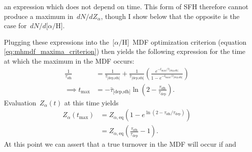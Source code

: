 \documentclass[12pt]{article}
\newcommand{\ah}{\ensuremath{\text{[$\alpha$/H]}}}
\newcommand{\timescale}[1]{\ensuremath{\tau_\text{#1}}}
\newcommand{\harmonic}[2]{\ensuremath{\bar{\tau}_\text{[#1,#2]}}}
\begin{document}
an expression which does not depend on time.
This form of SFH therefore cannot produce a maximum in~$dN / dZ_\alpha$, though
I show below that the opposite is the case for~$dN / d\ah$.
\par
Plugging these expressions into the~\ah~MDF optimization criterion (equation
\ref{eq:mhmdf_maxima_criterion}) then yields the following expression for the
time at which the maximum in the MDF occurs:
\begin{subequations}\begin{align}
\frac{1}{\timescale{sfh}} &= \frac{1}{\harmonic{dep}{sfh}} +
\frac{1}{\harmonic{dep}{sfh}} \left(\frac{
	e^{-t_\text{max} / \harmonic{dep}{sfh}}
}{
	1 - e^{-t_\text{max} / \harmonic{dep}{sfh}}
}\right)
\\
\implies t_\text{max} &= -\harmonic{dep}{sfh} \ln \left( 2 -
\frac{\timescale{sfh}}{\timescale{dep}}\right).
\end{align}\end{subequations}
Evaluation~$Z_\alpha(t)$ at this time yields
\begin{subequations}\begin{align}
Z_\alpha(t_\text{max}) &= Z_{\alpha,\text{eq}} \left(
1 - e^{\ln \left(2 - \timescale{sfh} / \timescale{dep}\right)}
\right)
\\
&= Z_{\alpha,\text{eq}} \left(\frac{\timescale{sfh}}{\timescale{dep}} -
1\right).
\end{align}\end{subequations}
At this point we can assert that a true turnover in the MDF will occur if and
\end{document}
